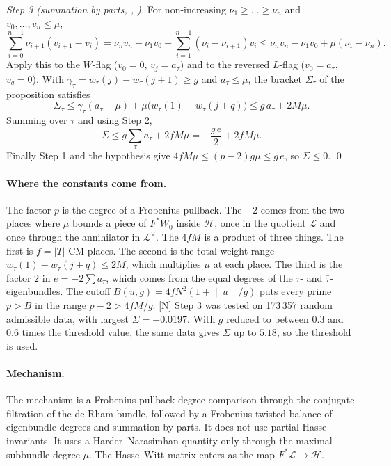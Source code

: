 \documentclass[11pt]{article}
\newcommand{\mN}{\textsf{[N]}}
\theoremstyle{remark}
\begin{document}
\noindent\emph{Step 3 (summation by parts, , ).} For non-increasing $\nu_1\ge\dots\ge\nu_n$ and $v_0,\dots,v_n\le\mu$,
\[
\sum_{i=0}^{n-1}\nu_{i+1}(v_{i+1}-v_i)=\nu_nv_n-\nu_1v_0+\sum_{i=1}^{n-1}(\nu_i-\nu_{i+1})v_i\le\nu_nv_n-\nu_1v_0+\mu(\nu_1-\nu_n).
\]
Apply this to the $W$-flag ($v_0=0$, $v_j=a_\tau$) and to the reversed $L$-flag ($v_0=a_\tau$, $v_q=0$). With $\gamma_\tau=w_\tau(j)-w_\tau(j+1)\ge g$ and $a_\tau\le\mu$, the bracket $\Sigma_\tau$ of the proposition satisfies
\[
\Sigma_\tau\le\gamma_\tau(a_\tau-\mu)+\mu\bigl(w_\tau(1)-w_\tau(j+q)\bigr)\le g\,a_\tau+2M\mu .
\]
Summing over $\tau$ and using Step 2,
\[
\Sigma\le g\sum_\tau a_\tau+2fM\mu=-\frac{g\,e}2+2fM\mu .
\]
Finally Step 1 and the hypothesis give $4fM\mu\le(p-2)g\mu\le g\,e$, so $\Sigma\le0$. \qed

\paragraph{Where the constants come from.} The factor $p$ is the degree of a Frobenius pullback. The $-2$ comes from the two places where $\mu$ bounds a piece of $F^*W_0$ inside $\mathcal H$, once in the quotient $\mathcal L$ and once through the annihilator in $\mathcal L^\vee$. The $4fM$ is a product of three things. The first is $f=\lvert T\rvert$ CM places. The second is the total weight range $w_\tau(1)-w_\tau(j+q)\le2M$, which multiplies $\mu$ at each place. The third is the factor $2$ in $e=-2\sum a_\tau$, which comes from the equal degrees of the $\tau$- and $\bar\tau$-eigenbundles. The cutoff $B(u,g)=4fN^2(1+\lVert u\rVert/g)$ puts every prime $p>B$ in the range $p-2>4fM/g$. \mN{} Step 3 was tested on 173\,357 random admissible data, with largest $\Sigma=-0.0197$. With $g$ reduced to between $0.3$ and $0.6$ times the threshold value, the same data gives $\Sigma$ up to $5.18$, so the threshold is used.

\paragraph{Mechanism.} The mechanism is a Frobenius-pullback degree comparison through the conjugate filtration of the de Rham bundle, followed by a Frobenius-twisted balance of eigenbundle degrees and summation by parts. It does not use partial Hasse invariants. It uses a Harder--Narasimhan quantity only through the maximal subbundle degree $\mu$. The Hasse--Witt matrix enters as the map $F^*\mathcal L\to\mathcal H$.
\end{document}

